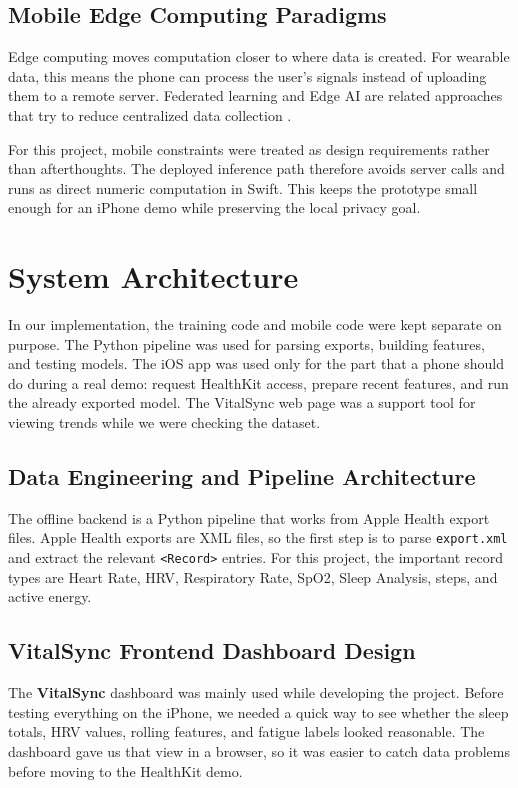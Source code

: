 \documentclass[sigconf,10pt]{acmart}
\begin{document}
\subsection{Mobile Edge Computing Paradigms}
Edge computing moves computation closer to where data is created. For wearable data, this means the phone can process the user's signals instead of uploading them to a remote server. Federated learning and Edge AI are related approaches that try to reduce centralized data collection \cite{mcmahan2017federated, raskar2020edge}.

For this project, mobile constraints were treated as design requirements rather than afterthoughts. The deployed inference path therefore avoids server calls and runs as direct numeric computation in Swift. This keeps the prototype small enough for an iPhone demo while preserving the local privacy goal.

\section{System Architecture}

In our implementation, the training code and mobile code were kept separate on purpose. The Python pipeline was used for parsing exports, building features, and testing models. The iOS app was used only for the part that a phone should do during a real demo: request HealthKit access, prepare recent features, and run the already exported model. The VitalSync web page was a support tool for viewing trends while we were checking the dataset.

\subsection{Data Engineering and Pipeline Architecture}
The offline backend is a Python pipeline that works from Apple Health export files. Apple Health exports are XML files, so the first step is to parse \texttt{export.xml} and extract the relevant \texttt{\textless Record\textgreater} entries. For this project, the important record types are Heart Rate, HRV, Respiratory Rate, SpO2, Sleep Analysis, steps, and active energy.

\subsection{VitalSync Frontend Dashboard Design}
The \textbf{VitalSync} dashboard was mainly used while developing the project. Before testing everything on the iPhone, we needed a quick way to see whether the sleep totals, HRV values, rolling features, and fatigue labels looked reasonable. The dashboard gave us that view in a browser, so it was easier to catch data problems before moving to the HealthKit demo.
\end{document}
